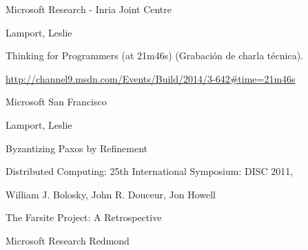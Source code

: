 \documentclass[spanish]{llncs}
\begin{document}
\begin{thebibliography}{5}
Microsoft Research - Inria Joint Centre

Lamport, Leslie 

Thinking for Programmers (at 21m46s) (Grabación de charla técnica). 

\url{http://channel9.msdn.com/Events/Build/2014/3-642#time=21m46s}

Microsoft San Francisco

Lamport, Leslie

Byzantizing Paxos by Refinement

Distributed Computing: 25th International Symposium: DISC 2011,

William J. Bolosky, John R. Douceur, Jon Howell

The Farsite Project: A Retrospective

Microsoft Research Redmond


\end{thebibliography}

\clearpage
\end{document}
